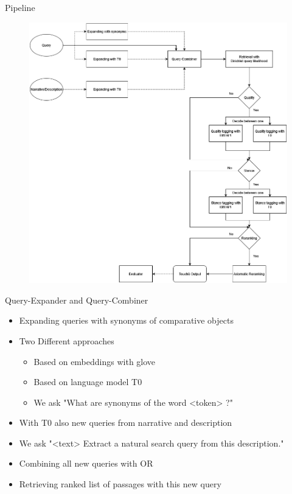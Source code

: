 \documentclass[english]{mlutalk}
\begin{document}
\begin{frame}{Pipeline}
    \begin{figure}
        \centering
        \includegraphics[scale=0.25]{figures/pipeline.png}
    \end{figure}
\end{frame}

\begin{frame}{Query-Expander and Query-Combiner}
    \begin{itemize}
        \item Expanding queries with synonyms of comparative objects
        \item Two Different approaches
        \begin{itemize}
            \item Based on embeddings with glove
            \item Based on language model T0~\cite{SanhWRBSACSLRDBXTSSKCNDCJWMSYPBWNRSSFFTBGBWR2021}
            \item We ask "What are synonyms of the word <token> ?" 
        \end{itemize}
        \item With T0 also new queries from narrative and description
        \item We ask "<text> Extract a natural search query from this description."
        \item Combining all new queries with OR
        \item Retrieving ranked list of passages with this new query 
    \end{itemize}
\end{frame}
\end{document}

